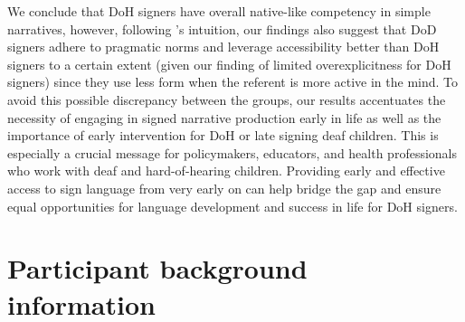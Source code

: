 \documentclass[review]{elsarticle} %
\begin{document}
We conclude that DoH signers have overall native-like competency in
simple narratives, however, following \citet{swabey2002}'s intuition,
our findings also suggest that DoD signers adhere to pragmatic norms and
leverage accessibility better than DoH signers to a certain extent
(given our finding of limited overexplicitness for DoH signers) since
they use less form when the referent is more active in the mind. To
avoid this possible discrepancy between the groups, our results
accentuates the necessity of engaging in signed narrative production
early in life as well as the importance of early intervention for DoH or
late signing deaf children. This is especially a crucial message for
policymakers, educators, and health professionals who work with deaf and
hard-of-hearing children. Providing early and effective access to sign
language from very early on can help bridge the gap and ensure equal
opportunities for language development and success in life for DoH
signers.

\clearpage

\appendix

\hypertarget{participant-background-information}{%
\section{Participant background
information}\label{participant-background-information}}

\label{section:a}
\end{document}
